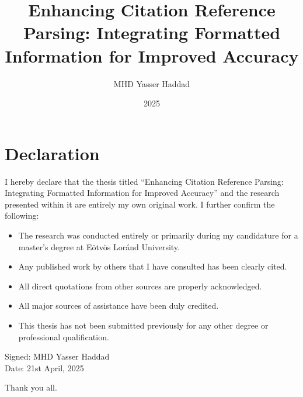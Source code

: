 \documentclass[
]{elteikthesis}[2024/04/26]
\title{Enhancing Citation Reference Parsing: Integrating Formatted Information for Improved
Accuracy} %
\date{2025} %
\author{MHD Yasser Haddad}
\affiliation{Lecturer} %
\begin{document}


\maketitle
%

\chapter*{Declaration}

I hereby declare that the thesis titled “Enhancing Citation Reference Parsing: Integrating Formatted Information for Improved Accuracy” and the research presented within it are entirely my own original work. I further confirm the following:

\begin{itemize} 
	\item The research was conducted entirely or primarily during my candidature for a master's degree at Eötvös Loránd University. 
	\item Any published work by others that I have consulted has been clearly cited. 
	\item All direct quotations from other sources are properly acknowledged. 
	\item All major sources of assistance have been duly credited. 
	\item This thesis has not been submitted previously for any other degree or professional qualification. 
\end{itemize}

\vspace{1cm}
\noindent
Signed: MHD Yasser Haddad \\
\vspace{0.2cm}
Date: 21st April, 2025

\vspace{0.5cm}
\noindent
Thank you all.

\cleardoublepage

\tableofcontents
\cleardoublepage


\cleardoublepage


\cleardoublepage
\end{document}
